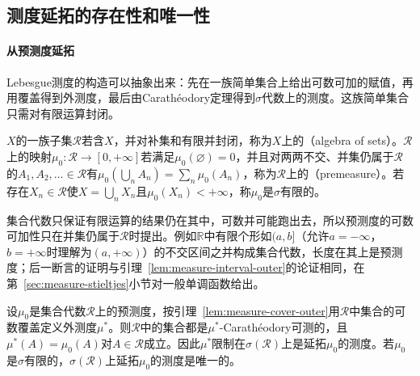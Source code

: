\subsection{测度延拓的存在性和唯一性}
\label{sec:measure-extension}

\paragraph{从预测度延拓}
Lebesgue测度的构造可以抽象出来：先在一族简单集合上给出可数可加的赋值，再用覆盖得到外测度，最后由Carathéodory定理得到$\sigma$代数上的测度。这族简单集合只需对有限运算封闭。

\begin{definition}[集合代数与预测度]
\label{def:measure-algebra-premeasure}
$X$的一族子集$\mathcal R$若含$X$，并对补集和有限并封闭，称为$X$上的（algebra of sets）。$\mathcal R$上的映射$\mu_0:\mathcal R\to[0,+\infty]$若满足$\mu_0(\varnothing)=0$，并且对两两不交、并集仍属于$\mathcal R$的$A_1,A_2,\dots\in\mathcal R$有$\mu_0(\bigcup_nA_n)=\sum_n\mu_0(A_n)$，称为$\mathcal R$上的（premeasure）。若存在$X_n\in\mathcal R$使$X=\bigcup_nX_n$且$\mu_0(X_n)<+\infty$，称$\mu_0$是$\sigma$有限的。
\end{definition}

集合代数只保证有限运算的结果仍在其中，可数并可能跑出去，所以预测度的可数可加性只在并集仍属于$\mathcal R$时提出。例如$\mathbb R$中有限个形如$(a,b]$（允许$a=-\infty$，$b=+\infty$时理解为$(a,+\infty)$）的不交区间之并构成集合代数，长度在其上是预测度；后一断言的证明与引理~\ref{lem:measure-interval-outer}的论证相同，在第~\ref{sec:measure-stieltjes}小节对一般单调函数给出。

\begin{theorem}[Carathéodory延拓定理]
\label{thm:measure-caratheodory}
设$\mu_0$是集合代数$\mathcal R$上的预测度，按引理~\ref{lem:measure-cover-outer}用$\mathcal R$中集合的可数覆盖定义外测度$\mu^*$。则$\mathcal R$中的集合都是$\mu^*$-Carathéodory可测的，且$\mu^*(A)=\mu_0(A)$对$A\in\mathcal R$成立。因此$\mu^*$限制在$\sigma(\mathcal R)$上是延拓$\mu_0$的测度。若$\mu_0$是$\sigma$有限的，$\sigma(\mathcal R)$上延拓$\mu_0$的测度是唯一的。
\end{theorem}

